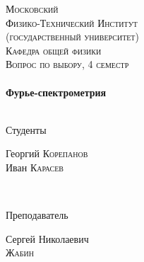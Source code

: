 \begin{titlepage}
\center %
 

\textsc{\LARGE Московский\\[-0.2cm]Физико-Технический Институт\\[0.1cm]\large (государственный университет)}\\[1.5cm] %
\textsc{\Large Кафедра общей физики}\\[0.1cm] %
\textsc{\large Вопрос по выбору, 4 семестр}\\[0.5cm] %


\HRule
\\[0.5cm]
{ \huge \bfseries Фурье-спектрометрия}
\\[0.3cm] %
\HRule
\\[1.5cm]


 

\begin{minipage}{0.4\textwidth}
	\begin{flushleft} \large
		\textsf{Студенты}
		
		Георгий \textsc{Корепанов} \\[-0.15cm]
		
		Иван \textsc{Карасев} \\[-0.15cm]

	\end{flushleft}
\end{minipage}
~
\begin{minipage}{0.4\textwidth}
	\begin{flushright} \large
		\textsf{Преподаватель}
		
		Сергей Николаевич\\[-0.15cm]
		\textsc{Жабин} %
	\end{flushright}
\end{minipage}


\end{titlepage}
